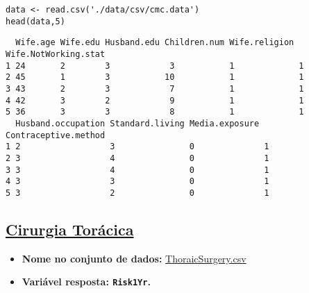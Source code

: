 \documentclass[12pt]{article}
\begin{document}
\begin{verbatim}
data <- read.csv('./data/csv/cmc.data')
head(data,5)
\end{verbatim}

\begin{verbatim}
  Wife.age Wife.edu Husband.edu Children.num Wife.religion Wife.NotWorking.stat
1 24       2        3            3           1             1                   
2 45       1        3           10           1             1                   
3 43       2        3            7           1             1                   
4 42       3        2            9           1             1                   
5 36       3        3            8           1             1                   
  Husband.occupation Standard.living Media.exposure Contraceptive.method
1 2                  3               0              1                   
2 3                  4               0              1                   
3 3                  4               0              1                   
4 3                  3               0              1                   
5 3                  2               0              1                   
\end{verbatim}
\clearpage

\subsection{\href{https://archive.ics.uci.edu/ml/datasets/Thoracic+Surgery+Data}{Cirurgia Torácica}}
\label{sec:orgd485175}
\begin{itemize}
\item \textbf{Nome no conjunto de dados:} \href{https://drive.google.com/file/d/13s1ZtCWotN\_VwQb07yTWEyBMmvO042At/view?usp=sharing}{ThoraicSurgery.csv}
\item \textbf{Variável resposta:  \texttt{Risk1Yr}.}
\end{itemize}
\end{document}

